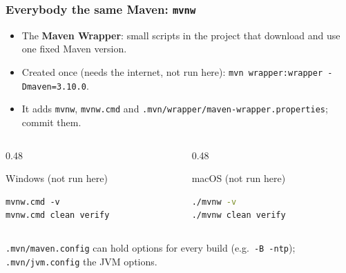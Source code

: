 \documentclass[aspectratio=169,10pt,compress]{beamer}
\begin{document}
\begin{frame}[t,fragile] \frametitle{Everybody the same Maven: \texttt{mvnw}}
  \begin{itemize}\small
    \item The \textbf{Maven Wrapper}: small scripts in the project that download and use one fixed Maven version.
    \item Created once (needs the internet, not run here): \texttt{mvn wrapper:wrapper -Dmaven=3.10.0}.
    \item It adds \texttt{mvnw}, \texttt{mvnw.cmd} and \texttt{.mvn/wrapper/maven-wrapper.properties}; commit them.
  \end{itemize}
  \begin{columns}[T]
    \begin{column}{0.48\textwidth}
      \begin{block}{Windows (not run here)}


\begin{lstlisting}[style=codesnippet, language={}, basicstyle=\ttfamily\scriptsize]
mvnw.cmd -v
mvnw.cmd clean verify
\end{lstlisting}


      \end{block}
    \end{column}
    \begin{column}{0.48\textwidth}
      \begin{block}{macOS (not run here)}


\begin{lstlisting}[style=codesnippet, language=bash, basicstyle=\ttfamily\scriptsize]
./mvnw -v
./mvnw clean verify
\end{lstlisting}


      \end{block}
    \end{column}
  \end{columns}

  \small \texttt{.mvn/maven.config} can hold options for every build (e.g.\ \texttt{-B -ntp}); \texttt{.mvn/jvm.config} the JVM options.
\end{frame}

\end{document}
